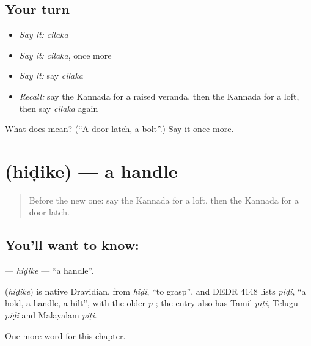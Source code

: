 \subsection*{Your turn}
\begin{itemize}
\raggedright
  \item \emph{Say it:} \emph{cilaka}
  \item \emph{Say it:} \emph{cilaka}, once more
  \item \emph{Say it:} say \emph{cilaka}
  \item \emph{Recall:} say the Kannada for a raised veranda, then the Kannada for a loft, then say \emph{cilaka} again
\end{itemize}

\begin{tcolorbox}[breakable,colback=teal!4,colframe=teal!35!black,title={Before you move on}]
What does  mean? (\textquotedblleft{}A door latch, a bolt\textquotedblright{}.) Say it once more.
\end{tcolorbox}
\section[\texorpdfstring{\kn{ಹಿಡಿಕೆ} (hiḍike)}{ಹಿಡಿಕೆ (hiḍike)}]{ (hiḍike) — a handle}

\label{lesson:KA-C303-hidike}



\begin{quote}
Before the new one: say the Kannada for a loft, then the Kannada for a door latch.
\end{quote}

\subsection*{You'll want to know: }
\textbf{} — \emph{hiḍike} — \textquotedblleft{}a handle\textquotedblright{}.

\begin{cousinweb}
\textbf{} (\emph{hiḍike}) is native Dravidian, from \emph{hiḍi}, \textquotedblleft{}to grasp\textquotedblright{}, and DEDR 4148 lists \emph{piḍi}, \textquotedblleft{}a hold, a handle, a hilt\textquotedblright{}, with the older \emph{p-}; the entry also has Tamil \emph{piṭi}, Telugu \emph{piḍi} and Malayalam \emph{piṭi}.
\end{cousinweb}

\begin{grammarlens}[title={What you've built}]
One more word for this chapter.
\end{grammarlens}

